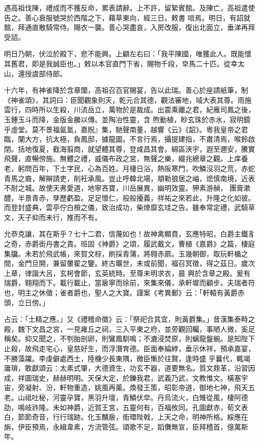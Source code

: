 \begin{pinyinscope}
 遇高祖伐陳，禮成而不獲反命，累表請辭。上不許，留縶賓館。及陳亡，高祖遣使告之。善心衰服號哭於西階之下，藉草東向，經三日。敕書
 唁焉。明日，有詔就館，拜通直散騎常侍。賜衣一襲。善心哭盡哀，入房改服，復出北面立，垂涕再拜受詔。



 明日乃朝，伏泣於殿下，悲不能興。上顧左右曰：「我平陳國，唯獲此人。既能懷其舊君，即是我誠臣也。」敕以本官直門下省，賜物千段，皁馬二十匹。從幸太山，還授虞部侍郎。



 十六年，有神雀降於含章闥，高祖召百官賜宴，告以此瑞。善心於座請紙筆，制《神雀頌》，其詞曰：臣聞觀象則天，乾元合其德，觀法審地，域大表其尊。雨施雲行，四時所以生殺，川流岳立，萬物於是裁成。出震乘離之君，紀雁司鳳之後，玉錘玉斗而降，金版金縢以傳。並陶冶性靈，含
 煦動植，眇玄珠於赤水，寂明鏡乎虛堂。莫不景福氤氳，嘉貺』集，馳聲南董，越響《云》《韶》。粵我皇帝之君臨，闡大方，抗太極，負鳳邸，據龍圖。不言行焉，攝提建指，不肅清焉，喉鈴啟閉。括地復夏，截海翦商，就望體其尊，登咸昌其會。綿區浹宇，遐至邇安，騰實飛聲，直暢傍施。無體之禮，威儀布政之宮，無聲之樂，綴兆總章之觀。上庠養老，躬問百年，下土字民，心為百姓。月棲日浴，熱阪寒門，吹鱗沒羽之荒，赤蛇青馬之裔，解辮請吏，削衽承風。豈止呼韓北場，頫勒狼居之岫，熄慎南境，近表不耐之城。故使天弗愛道，地寧吝寶，川岳展異，幽明效靈。狎素游赬，
 團膏漱醴，半景青赤，孳歷虧盈。足足懷仁，般般擾義，祥祐之來若此，升隆之化如彼。而登封盛典，雲亭佇白檢之儀，致治成功，柴燎靡玄珪之告。雖奉常定禮，武騎草文，天子抑而未行，推而不有。



 允恭克讓，其在斯乎？七十二君，信蔑如也！故神禽顯賁，玄應特昭，白爵主鐵豸之奇，赤爵銜丹書之貴。班固《神爵》之頌，履武戴文，曹植《嘉爵》之篇，棲庭集牖。未若於飛武帳，來賀文棕，刷採青蒲，將翱赤罽。玉幾朝御，取玩軒楯之間，金門旦開，兼留暈翟之鑒。終古曠世，未或前聞，福召冥徵，得之茲日。歲次上章，律諧大呂，玄枵會節，玄英統時。至尊未明求衣，晨
 興於含章之殿。爰有瑞爵，翱翔而下。載行載止，當扆寧而徐前，來集來儀，承軒墀而顧步。夫瑞者符也，明主之休徵；雀者爵也，聖人之大寶。謹案《考異郵》云：「軒轅有黃爵赤頭，立日傍。」



 占云：「土精之應。」又《禮稽命徵》云：「祭祀合其宜，則黃爵集。」昔漢集泰畤之殿，魏下文昌之宮，一見雍丘之祠，三入平東之府，並旁觀回矚，事陋人微，奚足稱矣。抑又聞之，不刳胎剖卵，則鸞鳳馴鳴；不漉浸焚原，則螭龍盤蜿。是知陛下止殺，故飛走宅心，皇慈好生，而浮潛育德。臣面奉綸綍，垂示休祥，預承嘉宴，不勝藻躍。李虔僻處西土，陸機少長東隅，微臣慚於往賢，逢時盛
 乎曩代，輒竭庸瑣，敢獻頌云：太素式肇，大德資生，功玄不器，道要無名。質文鼎革，沿習因成，祥圖瑞史，赫赫明明。天保大定，於鑠我君，武義乃武，文教惟文。橫塞宇宙，旁凝射、汾，軒物重造，姚風再薰。煥發王策，昭彰帝道，御地七神，飛天五老。山祗吐秘，河靈孕寶，黑羽升壇，青鱗伏皁。丹烏流火，白雉從風，棲阿德劭，鳴岐祚隆。未如神爵，近賀王宮，五靈何有，百福攸同。孔圖獻赤，荀文表白，節節奇音，行行瑞跡。化玉黼扆，銜環陛戟，上天之命，明神所格。綏應在旃，伊臣預焉，永緝韋素，方流管弦。頌歌不足，蹈儛無宣，臣拜稽首，億萬斯年。




\end{pinyinscope}
